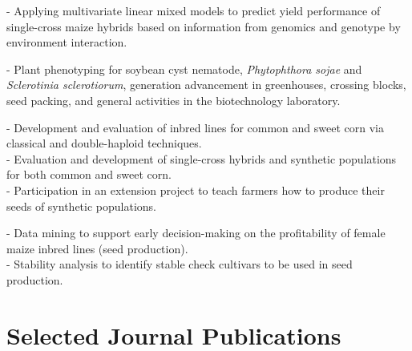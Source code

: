 \documentclass[]{mdkrause_cv_openfont}
\begin{document}
\begin{minipage}[t]{1\textwidth}
\sectionsep

- Applying multivariate linear mixed models to predict yield performance of single-cross maize hybrids based on information from genomics and genotype by environment interaction. 

\sectionsep

- Plant phenotyping for soybean cyst nematode, \textit{Phytophthora sojae} and \textit{Sclerotinia sclerotiorum}, generation advancement in greenhouses, crossing blocks, seed packing, and general activities in the biotechnology laboratory.

\sectionsep

- Development and evaluation of inbred lines for common and sweet corn via classical and double-haploid techniques. \\
- Evaluation and development of single-cross hybrids and synthetic populations for both common and sweet corn. \\
- Participation in an extension project to teach farmers how to produce their seeds of synthetic populations.

\sectionsep

- Data mining to support early decision-making on the profitability of female maize inbred lines (seed production). \\
- Stability analysis to identify stable check cultivars to be used in seed production. 

\sectionsep

\section{Selected Journal Publications} 


\end{minipage}
\end{document}
